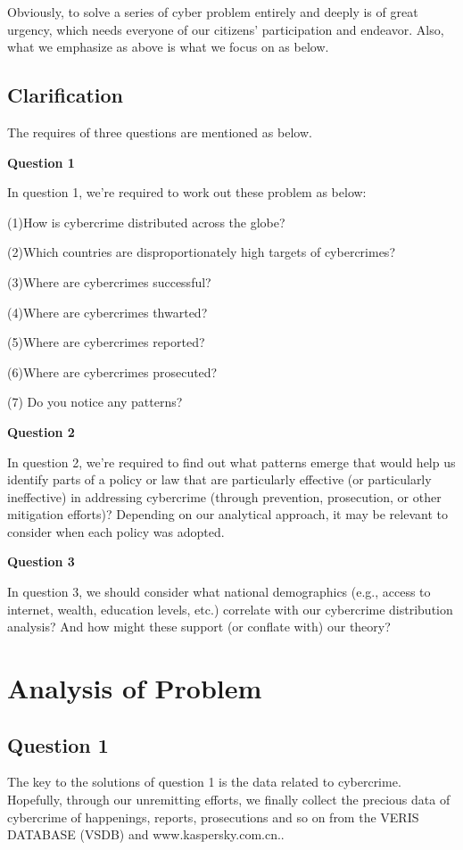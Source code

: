\documentclass[12pt]{article}
\begin{document}
	Obviously, to solve a series of cyber problem entirely and deeply is of great urgency, which needs everyone of our citizens’ participation and endeavor. Also, what we emphasize as above is what we focus on as below.

	\subsection{Clarification}
	The requires of three questions are mentioned as below.  
	
	\vspace{0.5cm}
	\textbf{Question 1}
	
	In question 1, we’re required to work out these problem as below:
	
	(1)How is cybercrime distributed across the globe? 
	
	(2)Which countries are disproportionately high targets of cybercrimes?
	
	(3)Where are cybercrimes successful?
	
	(4)Where are cybercrimes thwarted?
	
	(5)Where are cybercrimes reported?
	
	(6)Where are cybercrimes prosecuted? 
	
	(7) Do you notice any patterns?
	
	\vspace{0.5cm}
	\textbf{Question 2}
	
	In question 2, we’re required to find out what patterns emerge that would help us identify parts of a policy or law that are particularly effective (or particularly ineffective) in addressing cybercrime (through prevention, prosecution, or other mitigation efforts)? Depending on our analytical approach, it may be relevant to consider when each policy was adopted.

	\vspace{0.5cm}
	\textbf{Question 3}
	
	In question 3, we should consider what national demographics (e.g., access to internet, wealth, education levels, etc.) correlate with our cybercrime distribution analysis? And how might these support (or conflate with) our theory?

	\section{Analysis of Problem}
	\subsection{Question 1}
	The key to the solutions of question 1 is the data related to cybercrime. Hopefully, through our unremitting efforts, we finally collect the precious data of cybercrime of happenings, reports, prosecutions and so on from the VERIS DATABASE (VSDB) and www.kaspersky.com.cn..
	
\end{document}

